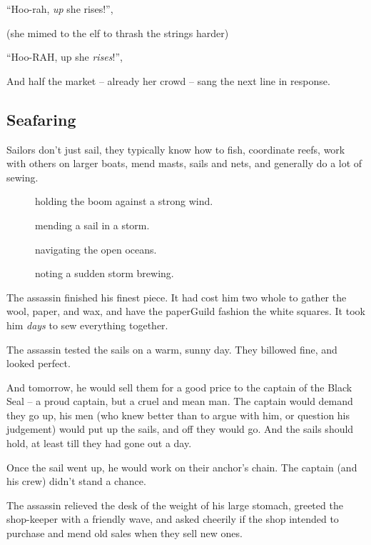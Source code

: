 \begin{multicols}{2}
\begin{exampletext}
  ``Hoo-rah, \emph{up} she rises!'',

  (she mimed to the elf to thrash the strings harder)

  ``Hoo-RAH, up she \emph{rises}!'',

  And half the market -- already her crowd -- sang the next line in response.

\end{exampletext}

\subsection{Seafaring}

Sailors don't just sail, they typically know how to fish, coordinate reefs, work with others on larger boats, mend masts, sails and nets, and generally do a lot of sewing.

\begin{description}
  \item[]
    holding the boom against a strong wind.
  \item[]
    mending a sail in a storm.
  \item[]
    navigating the open oceans.
  \item[]
    noting a sudden storm brewing.
\end{description}

\begin{exampletext}
  The assassin finished his finest piece.
  It had cost him two whole  to gather the wool, paper, and wax, and have the \gls{paperGuild} fashion the white squares.
  It took him \emph{days} to sew everything together.

  The assassin tested the sails on a warm, sunny day.
  They billowed fine, and looked perfect.

  And tomorrow, he would sell them for a good price to the captain of the Black Seal -- a proud captain, but a cruel and mean man.
  The captain would demand they go up, his men (who knew better than to argue with him, or question his judgement) would put up the sails, and off they would go.
  And the sails should hold, at least till they had gone out a day.

  Once the sail went up, he would work on their anchor's chain.
  The captain (and his crew) didn't stand a chance.

  The assassin relieved the desk of the weight of his large stomach, greeted the shop-keeper with a friendly wave, and asked cheerily if the shop intended to purchase and mend old sales when they sell new ones.


\end{exampletext}
\end{multicols}
